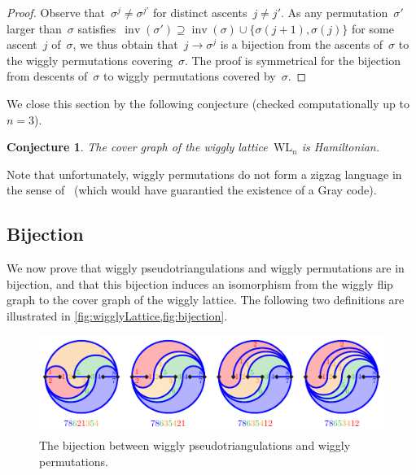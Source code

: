 \documentclass{amsart}
\newtheorem{conjecture}[theorem]{Conjecture}
\theoremstyle{definition}
\newcommand{\eqdef}{\mbox{\,\raisebox{0.2ex}{\scriptsize\ensuremath{\mathrm:}}\ensuremath{=}\,}} %
\DeclareMathOperator{\inv}{inv} %
\newcommand{\wigglyLattice}{\mathrm{WL}} %
\begin{document}
\begin{proof}
Observe that~$\sigma^j \ne \sigma^{j'}$ for distinct ascents~$j \ne j'$.
As any permutation~$\sigma'$ larger than~$\sigma$ satisfies~${\inv(\sigma') \supseteq \inv(\sigma) \cup \{\sigma(j+1), \sigma(j)\}}$ for some ascent~$j$ of~$\sigma$, we thus obtain that~$j \to \sigma^j$ is a bijection from the ascents of~$\sigma$ to the wiggly permutations covering~$\sigma$.
The proof is symmetrical for the bijection from descents of~$\sigma$ to wiggly permutations covered by~$\sigma$.
\end{proof}

We close this section by the following conjecture (checked computationally up to~$n = 3$).

\begin{conjecture}
\label{conj:Hamiltonian}
The cover graph of the wiggly lattice~$\wigglyLattice_n$ is Hamiltonian.
\end{conjecture}

Note that unfortunately, wiggly permutations do not form a zigzag language in the sense of~\cite{HartungHoangMutzeWilliams} (which would have guarantied the existence of a Gray code).


\subsection{Bijection}
\label{subsec:bijection}

We now prove that wiggly pseudotriangulations and wiggly permutations are in bijection, and that this bijection induces an isomorphism from the wiggly flip graph to the cover graph of the wiggly lattice.
The following two definitions are illustrated in \cref{fig:wigglyLattice,fig:bijection}.

\begin{figure}
\centerline{\includegraphics[scale=1.7]{bijection}}
\caption{The bijection between wiggly pseudotriangulations and wiggly permutations.}
\label{fig:bijection}
\end{figure}
\end{document}
